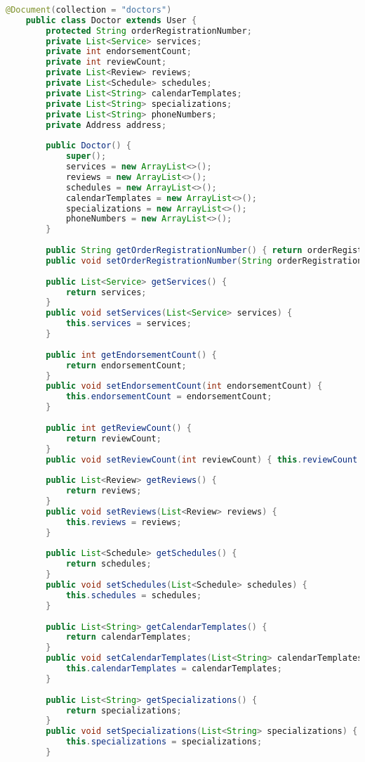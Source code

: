 \subsubsection{}
\begin{lstlisting}[language=java]
	@Document(collection = "doctors")
	public class Doctor extends User {
		protected String orderRegistrationNumber;
		private List<Service> services;
		private int endorsementCount;
		private int reviewCount;
		private List<Review> reviews;
		private List<Schedule> schedules;
		private List<String> calendarTemplates;
		private List<String> specializations;
		private List<String> phoneNumbers;
		private Address address;
		
		public Doctor() {
			super();
			services = new ArrayList<>();
			reviews = new ArrayList<>();
			schedules = new ArrayList<>();
			calendarTemplates = new ArrayList<>();
			specializations = new ArrayList<>();
			phoneNumbers = new ArrayList<>();
		}
		
		public String getOrderRegistrationNumber() { return orderRegistrationNumber; }
		public void setOrderRegistrationNumber(String orderRegistrationNumber) { this.orderRegistrationNumber = orderRegistrationNumber; }
		
		public List<Service> getServices() {
			return services;
		}
		public void setServices(List<Service> services) {
			this.services = services;
		}
		
		public int getEndorsementCount() {
			return endorsementCount;
		}
		public void setEndorsementCount(int endorsementCount) {
			this.endorsementCount = endorsementCount;
		}
		
		public int getReviewCount() {
			return reviewCount;
		}
		public void setReviewCount(int reviewCount) { this.reviewCount = reviewCount; }
		
		public List<Review> getReviews() {
			return reviews;
		}
		public void setReviews(List<Review> reviews) {
			this.reviews = reviews;
		}
		
		public List<Schedule> getSchedules() {
			return schedules;
		}
		public void setSchedules(List<Schedule> schedules) {
			this.schedules = schedules;
		}
		
		public List<String> getCalendarTemplates() {
			return calendarTemplates;
		}
		public void setCalendarTemplates(List<String> calendarTemplates) {
			this.calendarTemplates = calendarTemplates;
		}
		
		public List<String> getSpecializations() {
			return specializations;
		}
		public void setSpecializations(List<String> specializations) {
			this.specializations = specializations;
		}
		

\end{lstlisting}

